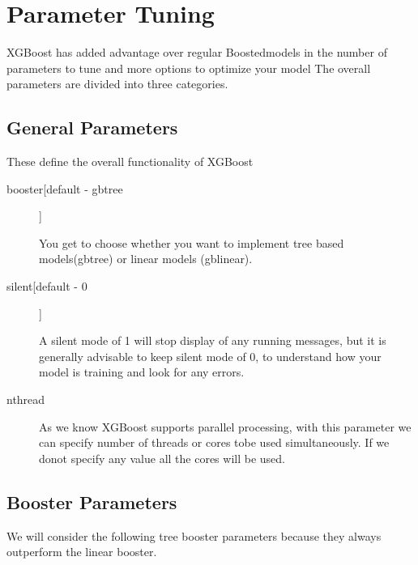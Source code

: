 \section{Parameter Tuning} 

XGBoost has added advantage over regular Boostedmodels in the number of
parameters  to tune and more options to optimize your model The overall
parameters are divided  into three categories.

\subsection{General Parameters}

These define the overall functionality of XGBoost

\begin{description}

\item[booster[default - gbtree]]

You get to choose whether you want to implement tree based models(gbtree) or
linear  models (gblinear).

\item[silent[default - 0]]

A silent mode of 1 will stop display of any running messages, but it is
generally  advisable to keep silent mode of 0, to understand how your model is
training and  look for any errors.

\item[nthread]

As we know XGBoost supports parallel processing, with this parameter we can
specify number of threads or cores tobe used simultaneously. If we donot specify
any value  all the cores will be used.

\end{description}

\subsection{Booster Parameters} 

We will consider the following tree booster parameters because they always
outperform  the linear booster.

